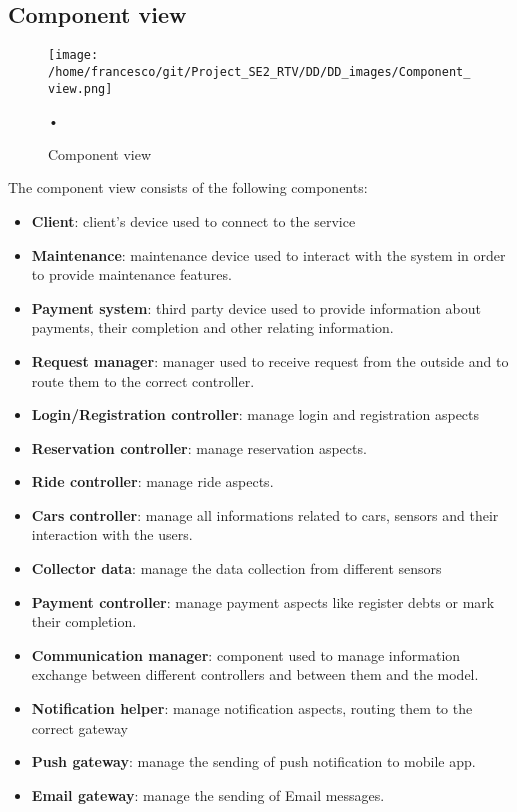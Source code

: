 \documentclass[10pt, a4paper,titlepage]{article}
\begin{document}
\subsection{Component view}
\begin{figure}
\begin{center}
\texttt{[image: /home/francesco/git/Project\_SE2\_RTV/DD/DD\_images/Component\_view.png]}
\caption{Component view}
\label{fig:component_view}
\end{center}•
\end{figure}
The component view consists of the following components:
\begin{itemize}
\item \textbf{Client}: client’s device used to connect to the service
\item \textbf{Maintenance}: maintenance device used to interact with the system in order to provide maintenance features.
\item \textbf{Payment system}: third party device used to provide information about payments, their completion and other relating information.
\item \textbf{Request manager}: manager used to receive request from the outside and to route them to the correct controller. 
\item \textbf{Login/Registration controller}: manage login and registration aspects
\item \textbf{Reservation controller}: manage reservation aspects.
\item \textbf{Ride controller}: manage ride aspects.
\item \textbf{Cars controller}: manage all informations related to cars, sensors and their interaction with the users.
\item \textbf{Collector data}: manage the data collection from different sensors
\item \textbf{Payment controller}: manage payment aspects like register debts or mark their completion.
\item \textbf{Communication manager}: component used to manage information exchange between different controllers and between them and the model.
\item \textbf{Notification helper}: manage notification aspects, routing them to the correct gateway
\item \textbf{Push gateway}: manage the sending of push notification to mobile app.
\item \textbf{Email gateway}: manage the sending of Email messages.

\end{itemize}
\end{document}
